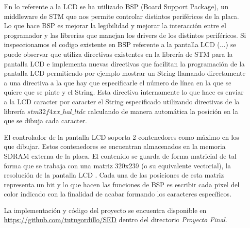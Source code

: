 En lo referente a la LCD se ha utilizado BSP (Board Support Package),
un middleware de STM que nos permite controlar distintos perif\'ericos
de la placa. Lo que hace BSP es mejorar la legibilidad y mejorar la
interacci\'on entre el programador y las librerias que manejan los
drivers de los distintos perif\'ericos. Si inspeccionamos el co\'digo
existente en BSP referente a la pantalla LCD (...) se puede observar
que utiliza directivas existentes en la librer\'ia de
STM para la pantalla LCD e implementa nuevas directivas que facilitan
la programaci\'on de la pantalla LCD permitiendo por ejemplo mostrar
un String llamando directamente a una directiva a la que hay que
especificarle el n\'umero de l\'inea en la que se quiere que se pinte
y el String. Esta directiva internamente lo que hace es enviar a la
LCD caracter por caracter el String especificado utilizando directivas
de la librer\'ia $stm32f4xx\_hal\_ltdc$ calculando de manera autom\'atica la posici\'on en la
que se dibuja cada caracter.

El controlador de la pantalla LCD soporta 2 contenedores como m\'aximo
en los que dibujar. Estos contenedores se encuentran almacenados en la
memoria SDRAM externa de la placa. El contenido se guarda de forma
matricial de tal forma que se trabaja con una matriz 320x239 (o su
equivalente vectorial), la
resoluci\'on de la pantalla LCD . Cada una de las posiciones de esta
matriz representa un bit y lo que hacen las funciones de BSP es
escribir cada pixel del color indicado con la finalidad de acabar
formando los caracteres espec\'ificos.

La implementaci\'on y c\'odigo del proyecto se encuentra disponible en
\url{https://github.com/tutugordillo/SED} dentro del directorio
\emph{Proyecto Final}.  
